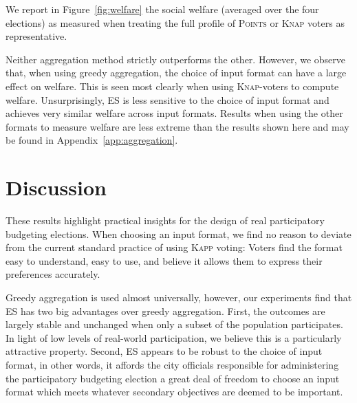 \documentclass{comsoc2023}
\newcommand{\points}{\textsc{Points}}
\newcommand{\knap}{\textsc{Knap}}
\newcommand{\kapp}{\textsc{Kapp}}
\newcommand{\mes}{ES}
\begin{document}
We report in Figure~\ref{fig:welfare} the   social welfare (averaged over the four elections) as measured when treating the full profile of \points{} or \knap{} voters as representative.  %


Neither aggregation method strictly outperforms the other. However, we observe that, when using greedy aggregation, the choice of input format can have a large effect on welfare. This is seen most clearly when using \knap-voters to compute welfare. Unsurprisingly, \mes{} is less sensitive to  the choice of input format and   achieves very similar welfare across input formats.
Results when using the other formats to measure welfare are less extreme than the results shown here and may be found in Appendix~\ref{app:aggregation}.


\section{Discussion}

These results highlight practical insights  for the design of real participatory budgeting elections. 
When choosing an input format, we find no reason to deviate from the current standard practice of  using \kapp{} voting: Voters find the format easy to understand, easy to  use, and believe it allows them to express their preferences accurately. 

Greedy aggregation is used almost universally,  however, our experiments find that \mes{} has  two  big advantages over greedy aggregation.  First,  the outcomes are largely stable and unchanged when only a subset of the population participates. In light of low levels of real-world participation, we believe this is a particularly attractive property. Second, \mes{} appears to be robust to the choice of input format, in other words, it affords the city officials responsible for administering the participatory budgeting election a great deal of freedom to choose an input format which meets whatever secondary objectives are deemed to be important. %
\end{document}
